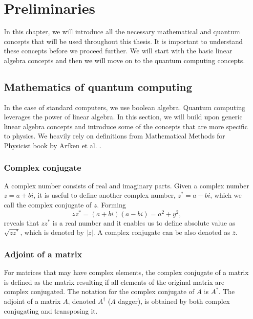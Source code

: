 \graphicspath{ {../images/}}

\chapter{Preliminaries}\label{ch:preliminaries}
In this chapter, we will introduce all the necessary mathematical and quantum concepts that will be used throughout this thesis. It is important to understand these concepts before we proceed further. We will start with the basic linear algebra concepts and then we will move on to the quantum computing concepts.
\section{Mathematics of quantum computing}
In the case of standard computers, we use boolean algebra. Quantum computing leverages the power of linear algebra. In this section, we will build upon generic linear algebra concepts and introduce some of the concepts that are more specific to physics. We heavily rely on definitions from Mathematical Methods for Physicist book by Arfken et al. \cite{mmp}.

\subsection{Complex conjugate}
A complex number consists of real and imaginary parts. Given a complex number $z = a + bi$, it is useful to define another complex number, $z^{*} = a - bi$, which we call the complex conjugate of $z$. Forming
$$zz^{*} = (a + bi)(a - bi) = a^2 + y^2,$$ reveals that $zz^{*}$ is a real number and it enables us to define absolute value as $\sqrt{zz^{*}}$, which is denoted by $\lvert z \rvert$. A complex conjugate can be also denoted as $\bar{z}$.

\subsection{Adjoint of a matrix}
For matrices that may have complex elements, the complex conjugate of a matrix is defined as the matrix resulting if all elements of the original matrix are complex conjugated. The notation for the complex conjugate of $A$ is $A^*$. The adjoint of a matrix $A$, denoted $A^\dag$ ($A$ dagger), is obtained by both complex conjugating and transposing it.


